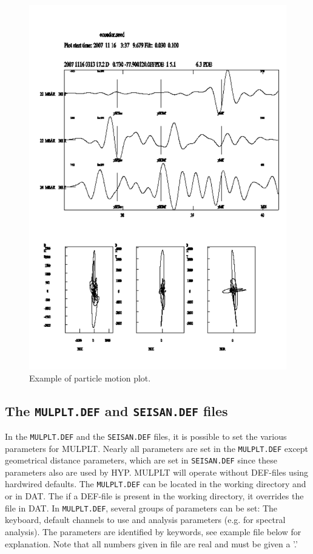 \begin{figure}
\centerline{\includegraphics[width=0.9\linewidth]{fig/fig27}}
\caption{Example of particle motion plot.}
\end{figure}

\subsection{The \texttt{MULPLT.DEF} and \texttt{SEISAN.DEF} files}

In the \texttt{MULPLT.DEF} and the \texttt{SEISAN.DEF} files, it is possible to set the various parameters for MULPLT. Nearly all parameters are set in the \texttt{MULPLT.DEF} except geometrical distance parameters, which are set in \texttt{SEISAN.DEF} since these parameters also are used by HYP. MULPLT will operate without DEF-files using hardwired defaults. The \texttt{MULPLT.DEF} can be located in the working directory and or in DAT. The if a DEF-file is present in the working directory, it overrides the file in DAT. In \texttt{MULPLT.DEF}, several groups of parameters can be set: The keyboard, default channels to use and analysis parameters (e.g. for spectral analysis). The parameters are identified by keywords, see example file below for explanation.
Note that all numbers given in file are real and must be given a '.'

